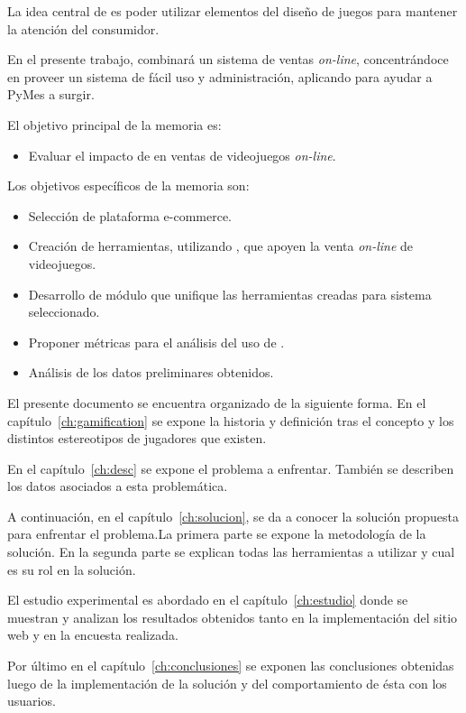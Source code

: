 La idea central de  {\gam} es poder utilizar elementos del diseño de juegos
para mantener la atención del consumidor.

En el presente trabajo, combinará un sistema de ventas \emph{on-line}, concentrándoce
en proveer un sistema de fácil uso y administración, aplicando {\gam}
para ayudar a PyMes a surgir.

El objetivo principal de la memoria es:

\begin{itemize}
    \item Evaluar el impacto de {\gam} en ventas de videojuegos \emph{on-line}.
\end{itemize}

Los objetivos específicos de la memoria son:
\begin{itemize}
    \item Selección de plataforma e-commerce.
    \item Creación de herramientas, utilizando {\gam}, que apoyen la
          venta \emph{on-line} de videojuegos.
    \item Desarrollo de módulo que unifique las herramientas creadas para sistema
          seleccionado.
    \item Proponer métricas para el análisis del uso de {\gam}.
    \item Análisis de los datos preliminares obtenidos.
\end{itemize}

El presente documento se encuentra organizado de la siguiente forma.
En el capítulo~\ref{ch:gamification} se expone la historia y definición tras
el concepto y los distintos estereotipos de jugadores que existen.

En el capítulo~\ref{ch:desc} se expone el problema a enfrentar.
También se describen los datos asociados a esta problemática.

A continuación, en el capítulo~\ref{ch:solucion}, se da a conocer la solución
propuesta para enfrentar el problema.La primera parte se expone la metodología
de la solución. En la segunda parte se explican todas las herramientas a utilizar
 y cual es su rol en la solución.

El estudio experimental es abordado en el capítulo~\ref{ch:estudio} donde
se muestran y analizan los resultados obtenidos tanto en la implementación
del sitio web y en la encuesta realizada.

Por último en el capítulo~\ref{ch:conclusiones} se exponen las conclusiones
obtenidas luego de la implementación de la solución y del comportamiento de ésta
con los usuarios.

